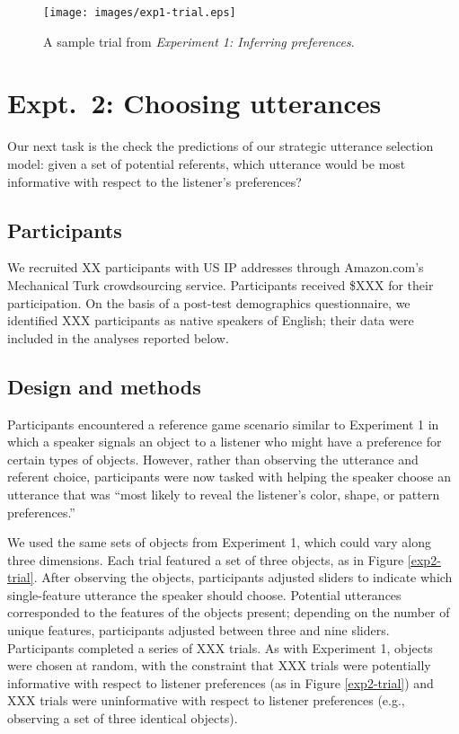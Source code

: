 \documentclass[10pt,a4paper]{article}
\begin{document}
\begin{figure}[ht]
	\centering
	\texttt{[image: images/exp1-trial.eps]}
	\caption{A sample trial from \emph{Experiment 1: Inferring preferences}.}\label{exp1-trial}
\end{figure}


\section{Expt.~2: Choosing utterances}

Our next task is the check the predictions of our strategic utterance selection model: given a set of potential referents, which utterance would be most informative with respect to the listener's preferences?

\subsection{Participants}

We recruited XX participants with US IP addresses through Amazon.com's Mechanical Turk crowdsourcing service. Participants received \$XXX for their participation. On the basis of a post-test demographics questionnaire, we identified XXX participants as native speakers of English; their data were included in the analyses reported below.

\subsection{Design and methods}

Participants encountered a reference game scenario similar to Experiment 1 in which a speaker signals an object to a listener who might have a preference for certain types of objects. However, rather than observing the utterance and referent choice, participants were now tasked with helping the speaker choose an utterance that was ``most likely to reveal the listener's color, shape, or pattern preferences.''

We used the same sets of objects from Experiment 1, which could vary along three dimensions. Each trial featured a set of three objects, as in Figure \ref{exp2-trial}. After observing the objects, participants adjusted sliders to indicate which single-feature utterance the speaker should choose. Potential utterances corresponded to the features of the objects present; depending on the number of unique features, participants adjusted between three and nine sliders. Participants completed a series of XXX trials. As with Experiment 1, objects were chosen at random, with the constraint that XXX trials were potentially informative with respect to listener preferences (as in Figure \ref{exp2-trial}) and XXX trials were uninformative with respect to listener preferences (e.g., observing a set of three identical objects). 
\end{document}
